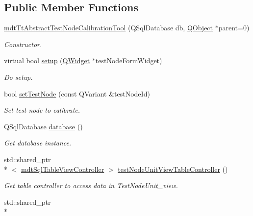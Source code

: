 \subsection*{Public Member Functions}
\begin{DoxyCompactItemize}
\item 
\hyperlink{classmdt_tt_abstract_test_node_calibration_tool_af74473766d512098c3e528e4f5865ade}{mdt\-Tt\-Abstract\-Test\-Node\-Calibration\-Tool} (Q\-Sql\-Database db, \hyperlink{class_q_object}{Q\-Object} $\ast$parent=0)
\begin{DoxyCompactList}\small\item\em Constructor. \end{DoxyCompactList}\item 
virtual bool \hyperlink{classmdt_tt_abstract_test_node_calibration_tool_a89e27cd930547aef0ba143519408ce1b}{setup} (\hyperlink{class_q_widget}{Q\-Widget} $\ast$test\-Node\-Form\-Widget)
\begin{DoxyCompactList}\small\item\em Do setup. \end{DoxyCompactList}\item 
bool \hyperlink{classmdt_tt_abstract_test_node_calibration_tool_a85c47fe2b501769f5966a27aeb3f051a}{set\-Test\-Node} (const Q\-Variant \&test\-Node\-Id)
\begin{DoxyCompactList}\small\item\em Set test node to calibrate. \end{DoxyCompactList}\item 
Q\-Sql\-Database \hyperlink{classmdt_tt_abstract_test_node_calibration_tool_abd953e46ec2e7d2295ec03cd697ffd7e}{database} ()
\begin{DoxyCompactList}\small\item\em Get database instance. \end{DoxyCompactList}\item 
std\-::shared\-\_\-ptr\\*
$<$ \hyperlink{classmdt_sql_table_view_controller}{mdt\-Sql\-Table\-View\-Controller} $>$ \hyperlink{classmdt_tt_abstract_test_node_calibration_tool_a0d11cc7bad0c02615b2d636a67de5c76}{test\-Node\-Unit\-View\-Table\-Controller} ()
\begin{DoxyCompactList}\small\item\em Get table controller to access data in Test\-Node\-Unit\-\_\-view. \end{DoxyCompactList}\item 
std\-::shared\-\_\-ptr\\*

\end{DoxyCompactItemize}
